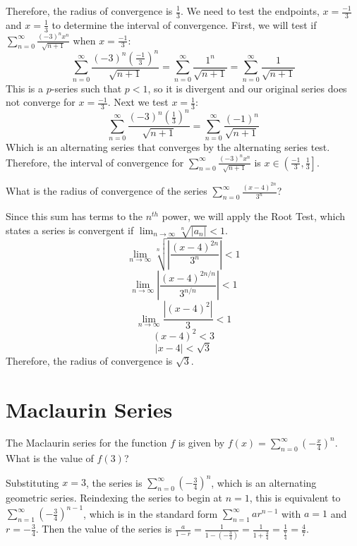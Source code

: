 Therefore, the radius of convergence is $\frac{1}{3}$. We need to test the 
endpoints, $x = \frac{-1}{3}$ and $x = \frac{1}{3}$ to determine the interval 
of convergence. First, we will test if $\sum_{n=0}^\infty \frac{(-3)^n x^n}{
\sqrt{n + 1}}$ when $x = \frac{-1}{3}$:
$$\sum_{n=0}^\infty \frac{(-3)^n \left( \frac{-1}{3} \right)^n}{\sqrt{n + 1}} 
= \sum_{n = 0}^\infty \frac{1^n}{\sqrt{n + 1}} = \sum_{n = 0}^\infty \frac{1}{
\sqrt{n + 1}}$$
This is a $p$-series such that $ p < 1$, so it is divergent and our original 
series does not converge for $x = \frac{-1}{3}$. Next we test $x = \frac{1}{3}$:
$$\sum_{n=0}^\infty \frac{(-3)^n \left( \frac{1}{3} \right)^n}{\sqrt{n + 1}} = 
\sum_{n = 0}^\infty \frac{(-1)^n}{\sqrt{n + 1}}$$
Which is an alternating series that converges by the alternating series test. 
Therefore, the interval of convergence for $\sum_{n=0}^\infty \frac{(-3)^n x^n}
{\sqrt{n + 1}}$ is $x \in \left( \frac{-1}{3}, \frac{1}{3} \right]$. 

\begin{Exercise} What is the radius of convergence 
of the series $\sum_{n=0}^\infty \frac{(x - 4)^{2n}}{3^n}$?
\end{Exercise}

\begin{Answer}[ref = radconv1]
Since this sum has terms to the $n^{th}$ power, we will apply the Root Test, 
which states a series is convergent if $\lim_{n \to \infty} \sqrt[n]{\left| 
a_n \right|} < 1$. 
$$\lim_{n \to \infty} \sqrt[n]{\left| \frac{(x - 4)^{2n}}{3^n} \right|} < 1$$
$$\lim_{n \to \infty} \left| \frac{(x - 4) ^ {2n/n}}{3^{n/n}} \right| < 1$$
$$\lim_{n \to \infty} \frac{\left| (x-4)^2 \right|}{3} < 1$$
$$(x - 4)^2 < 3$$
$$\left| x - 4 \right| < \sqrt{3}$$
Therefore, the radius of convergence is $\sqrt{3}$. 
\end{Answer}

\section{Maclaurin Series}

\begin{Exercise} The Maclaurin series for the 
function $f$ is given by $f(x) = \sum_{n=0}^\infty \left( -\frac{x}{4} \right)^
n$. What is the value of $f(3)$?
\end{Exercise}

\begin{Answer}[ref = mac1]
Substituting $x = 3$, the series is $\sum_{n=0}^\infty \left( -\frac{3}{4} 
\right)^n$, which is an alternating geometric series. Reindexing the series to 
begin at $n = 1$, this is equivalent to $\sum_{n = 1}^\infty \left( - 
\frac{3}{4} \right) ^ {n - 1}$, which is in the standard form $\sum_{n=1}^
\infty ar^{n-1}$ with $a = 1$ and $r = -\frac{3}{4}$. Then the value of the 
series is $\frac{a}{1-r} = \frac{1}{1-\left(- \frac{3}{4} \right)} = \frac{1}{1 
+ \frac{3}{4}} = \frac{1}{\frac{7}{4}} = \frac{4}{7}$. 
\end{Answer}